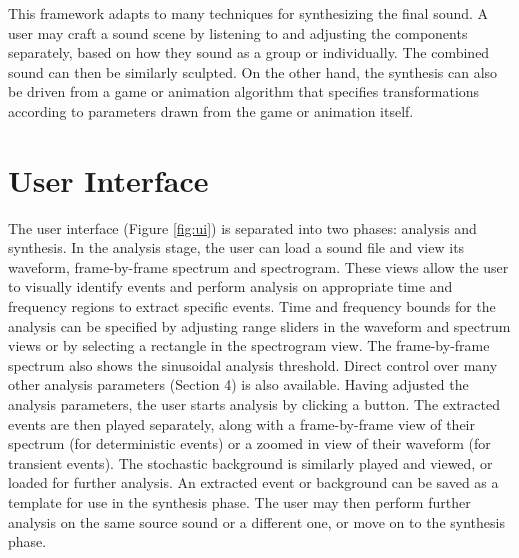 \documentclass[a4paper]{article}
\begin{document}
This framework adapts to many techniques for synthesizing the final sound. A user may 
craft a sound scene by listening to and adjusting the components separately, based on how they 
sound as a group or individually. The combined sound can then be similarly sculpted. On the other 
hand, the synthesis can also be driven from a game or animation algorithm that specifies 
transformations according to parameters drawn from the game or animation itself.

\section{User Interface}

The user interface (Figure \ref{fig:ui}) is separated into two phases: analysis and 
synthesis. In the analysis stage, the user can load a sound file and view its waveform, 
frame-by-frame spectrum and spectrogram. These views allow the user to visually 
identify events and perform analysis on appropriate time and frequency regions to 
extract specific events. Time and frequency 
bounds for the analysis can be specified by adjusting range sliders in the waveform 
and spectrum views or by selecting a rectangle in the spectrogram view. The frame-by-frame 
spectrum also shows the sinusoidal analysis threshold. Direct 
control over many other analysis parameters (Section 4) is also available. 
Having adjusted the analysis parameters, the user starts analysis by clicking a button. 
The extracted events are then played separately, along with a frame-by-frame view of 
their spectrum (for deterministic events) or a zoomed in view of their 
waveform (for transient events). The stochastic background is similarly 
played and viewed, or loaded for further analysis. An 
extracted event or background can be saved as a template for use in 
the synthesis phase. The user may then perform further analysis on the same source sound or 
a different one, or move on to the synthesis phase.
\end{document}
